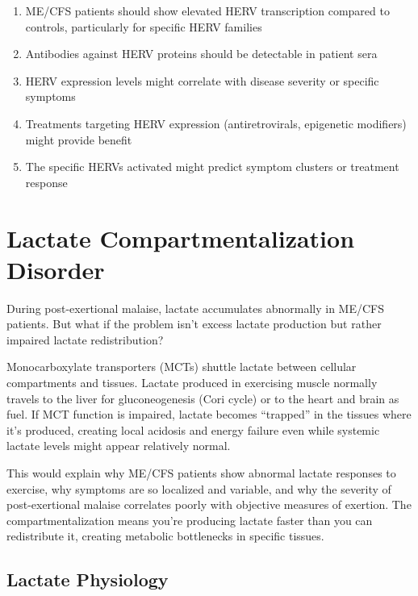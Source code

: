 \begin{enumerate}
    \item ME/CFS patients should show elevated HERV transcription compared to controls, particularly for specific HERV families
    \item Antibodies against HERV proteins should be detectable in patient sera
    \item HERV expression levels might correlate with disease severity or specific symptoms
    \item Treatments targeting HERV expression (antiretrovirals, epigenetic modifiers) might provide benefit
    \item The specific HERVs activated might predict symptom clusters or treatment response
\end{enumerate}


\section{Lactate Compartmentalization Disorder}
\label{sec:lactate-compartment}

\begin{open_question}
During post-exertional malaise, lactate accumulates abnormally in ME/CFS patients. But what if the problem isn't excess lactate production but rather impaired lactate redistribution?

Monocarboxylate transporters (MCTs) shuttle lactate between cellular compartments and tissues. Lactate produced in exercising muscle normally travels to the liver for gluconeogenesis (Cori cycle) or to the heart and brain as fuel. If MCT function is impaired, lactate becomes ``trapped'' in the tissues where it's produced, creating local acidosis and energy failure even while systemic lactate levels might appear relatively normal.

This would explain why ME/CFS patients show abnormal lactate responses to exercise, why symptoms are so localized and variable, and why the severity of post-exertional malaise correlates poorly with objective measures of exertion. The compartmentalization means you're producing lactate faster than you can redistribute it, creating metabolic bottlenecks in specific tissues.
\end{open_question}

\subsection{Lactate Physiology}

